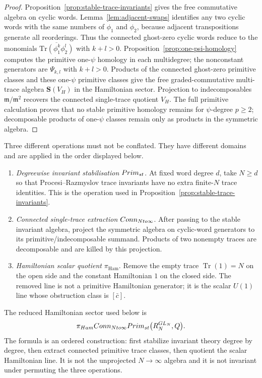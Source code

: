 \documentclass[11pt]{memoir}
\begin{document}
\begin{proof}
  Proposition~\ref{prop:stable-trace-invariants} gives the free commutative
  algebra on cyclic words.
  Lemma~\ref{lem:adjacent-swaps} identifies any two cyclic words with the same
  numbers of $\phi_1$ and $\phi_2$, because adjacent transpositions generate
  all reorderings. Thus the connected ghost-zero cyclic words reduce to the
  monomials \(\overline{\mathrm{Tr}(\phi_1^k\phi_2^l)}\) with \(k+l>0\).
	  Proposition~\ref{prop:one-psi-homology} computes the primitive one-$\psi$
	  homology in each multidegree; the nonconstant generators are $\Psi_{k,l}$ with
	  $k+l>0$. Products of the connected ghost-zero primitive classes and these
	  one-$\psi$ primitive classes give the free graded-commutative multi-trace
	  algebra \(\mathbf S(V_H)\) in the Hamiltonian sector.  Projection to
	  indecomposables \(\mathfrak m/\mathfrak m^2\) recovers the connected
	  single-trace quotient \(V_H\).  The full primitive calculation proves
  that no stable primitive homology remains for \(\psi\)-degree \(p\ge2\);
  decomposable products of one-\(\psi\) classes remain only as products in
  the symmetric algebra.
\end{proof}

\begin{defn}\label{defn:three-large-N-operations}
  Three different operations must not be conflated. They have different
  domains and are applied in the order
  displayed below.
  \begin{enumerate}
    \item \emph{Degreewise invariant stabilisation}
      \(Prim_{st}\).  At fixed word degree \(d\), take
      \(N\ge d\) so that Procesi--Razmyslov trace invariants have no
      extra finite-\(N\) trace identities.  This is the operation used in
      Proposition~\ref{prop:stable-trace-invariants}.
    \item \emph{Connected single-trace extraction}
      \(Conn_{Nto\infty}\).  After passing to the stable invariant
      algebra, project the symmetric algebra on cyclic-word generators to
      its primitive/indecomposable summand.  Products of two nonempty
      traces are decomposable and are killed by this projection.
    \item \emph{Hamiltonian scalar quotient}
      \(\pi_{\mathrm{Ham}}\).  Remove the empty trace
      \(\operatorname{Tr}(1)=N\) on the open side and the constant
      Hamiltonian \(1\) on the closed side.  The removed line is not a
      primitive Hamiltonian generator; it is the scalar \(U(1)\) line
      whose obstruction class is \([\bar c]\).
  \end{enumerate}
  The reduced Hamiltonian sector used below is
  \[
    \pi_{Ham}Conn_{Nto\infty}Prim_{st}
    \bigl(R_N^{GL_N},Q\bigr).
  \]
  The formula is an ordered construction: first stabilize invariant
  theory degree by degree, then extract connected primitive trace
  classes, then quotient the scalar Hamiltonian line. It is not the
  unprojected \(N\to\infty\) algebra and it is not invariant under
  permuting the three operations.
\end{defn}
\end{document}
